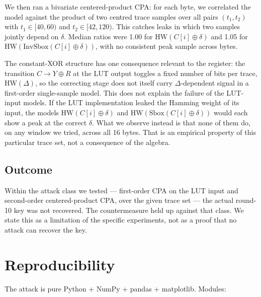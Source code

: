 \documentclass[conference,9pt]{IEEEtran}
\newcommand{\HW}{\mathrm{HW}}
\newcommand{\Sb}{\mathrm{Sbox}}
\newcommand{\ISb}{\mathrm{InvSbox}}
\begin{document}
We then ran a bivariate centered-product CPA: for each byte, we correlated the model against the product of two centred trace samples over all pairs $(t_1,t_2)$ with $t_1\in[40,60)$ and $t_2\in[42,120)$. This catches leaks in which two samples jointly depend on $\delta$. Median ratios were 1.00 for $\HW(C[i]\oplus\delta)$ and 1.05 for $\HW(\ISb(C[i]\oplus\delta))$, with no consistent peak sample across bytes.

The constant-XOR structure has one consequence relevant to the register: the transition $C \to Y \oplus R$ at the LUT output toggles a fixed number of bits per trace, $\HW(\Delta)$, so the correcting stage does not itself carry $\Delta$-dependent signal in a first-order single-sample model. This does not explain the failure of the LUT-input models. If the LUT implementation leaked the Hamming weight of its input, the models $\HW(C[i]\oplus\delta)$ and $\HW(\Sb(C[i]\oplus\delta))$ would each show a peak at the correct $\delta$. What we observe instead is that none of them do, on any window we tried, across all 16 bytes. That is an empirical property of this particular trace set, not a consequence of the algebra.

\subsection{Outcome}
Within the attack class we tested --- first-order CPA on the LUT input and second-order centered-product CPA, over the given trace set --- the actual round-10 key was not recovered. The countermeasure held up against that class. We state this as a limitation of the specific experiments, not as a proof that no attack can recover the key.

\section{Reproducibility}
The attack is pure Python + NumPy + pandas + matplotlib. Modules:
\end{document}
